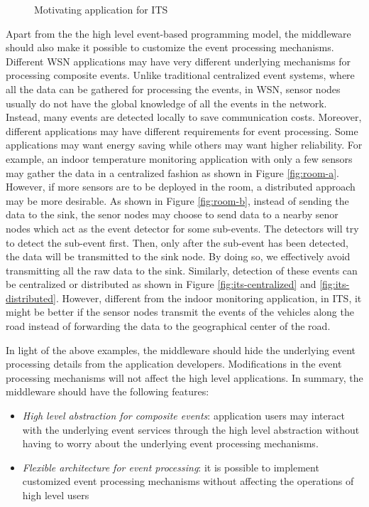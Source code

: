 \begin{figure}
\centering
{}
\caption{Motivating application for ITS}
\label{fig:its}
\end{figure}

Apart from the the high level event-based programming model, the middleware should also make it possible to customize the event processing mechanisms. Different WSN applications may have very different underlying mechanisms for processing composite events. Unlike traditional centralized event systems, where all the data can be gathered for processing the events, in WSN, sensor nodes usually do not have the global knowledge of all the events in the network. Instead, many events are detected locally to save communication costs. Moreover, different applications may have different requirements for event processing. Some applications may want energy saving while others may want higher reliability. For example, an indoor temperature monitoring application with only a few sensors may gather the data in a centralized fashion as shown in Figure \ref{fig:room-a}. However, if more sensors are to be deployed in the room, a distributed approach may be more desirable. As shown in Figure \ref{fig:room-b}, instead of sending the data to the sink, the senor nodes may choose to send data to a nearby senor nodes which act as the event detector for some sub-events. The detectors will try to detect the sub-event first. Then, only after the sub-event has been detected, the data will be transmitted to the sink node. By doing so, we effectively avoid transmitting all the raw data to the sink. Similarly, detection of these events can be centralized or distributed as shown in Figure \ref{fig:its-centralized} and \ref{fig:its-distributed}. However, different from the indoor monitoring application, in ITS, it might be better if the sensor nodes transmit the events of the vehicles along the road instead of forwarding the data to the geographical center of the road. 

In light of the above examples, the middleware should hide the underlying event processing details from the application developers. Modifications in the event processing mechanisms will not affect the high level applications. In summary, the middleware should have the following features:
\begin{itemize}
\item \emph{High level abstraction for composite events}: application users may interact with the underlying event services through the high level abstraction without having to worry about the underlying event processing mechanisms.
\item \emph{Flexible architecture for event processing}: it is possible to implement customized event processing mechanisms without affecting the operations of high level users
\end{itemize}

